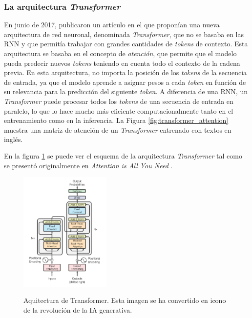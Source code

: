 \subsubsection{La arquitectura \emph{Transformer}}
En junio de 2017, \citeauthor{vaswaniAttentionAllYou2017} publicaron un artículo \citep{vaswaniAttentionAllYou2017} en el que proponían una nueva arquitectura de red neuronal, denominada \emph{Transformer}, que no se basaba en las RNN y que permitía trabajar con grandes cantidades de \emph{tokens} de contexto. Esta arquitectura se basaba en el concepto de \emph{atención}, que permite que el modelo pueda predecir nuevos \emph{tokens} teniendo en cuenta todo el contexto de la cadena previa. En esta arquitectura, no importa la posición de los \emph{tokens} de la secuencia de entrada, ya que el modelo aprende a asignar pesos a cada \emph{token} en función de su relevancia para la predicción del siguiente \emph{token}. A diferencia de una RNN, un \emph{Transformer} puede procesar todos los \emph{tokens} de una secuencia de entrada en paralelo, lo que lo hace mucho más eficiente computacionalmente tanto en el entrenamiento como en la inferencia. La Figura \ref{fig:transformer_attention} muestra una matriz de atención de un \emph{Transformer} entrenado con textos en inglés.

En la figura \ref{fig:transformer_architecture} se puede ver el esquema de la arquitectura \emph{Transformer} tal como se presentó originalmente en \emph{Attention is All You Need} \cite{vaswaniAttentionAllYou2017}.

\begin{figure}[H]
    \caption[Aquitectura de Transformer]{Aquitectura de Transformer. Esta imagen se ha convertido en icono de la revolución de la IA generativa.}
    \centering
    \includegraphics[width=0.4\textwidth]{./figuras/Transformer_architecture.png}
    \label{fig:transformer_architecture}
\end{figure}

